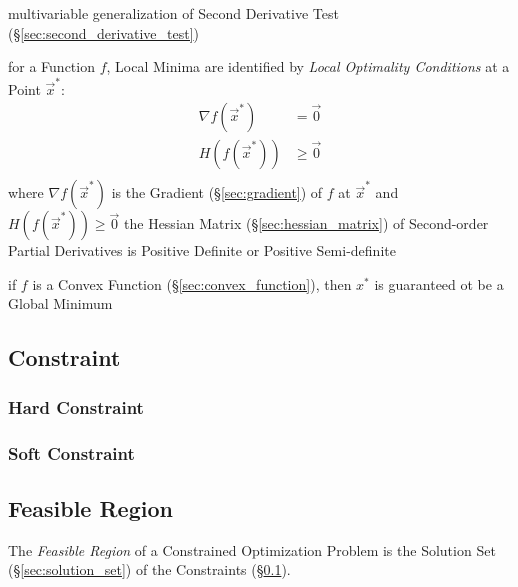 \fist multivariable generalization of Second Derivative Test
(\S\ref{sec:second_derivative_test})

for a Function $f$, Local Minima are identified by \emph{Local Optimality
  Conditions} at a Point $\vec{x}^*$:
\begin{align*}
  \nabla f(\vec{x}^*) & =    \vec{0} \\
  H(f(\vec{x}^*))     & \geq \vec{0} \\
\end{align*}
where $\nabla f(\vec{x}^*)$ is the Gradient (\S\ref{sec:gradient}) of $f$ at
$\vec{x}^*$ and $H(f(\vec{x}^*)) \geq \vec{0}$ the Hessian Matrix
(\S\ref{sec:hessian_matrix}) of Second-order Partial Derivatives is Positive
Definite or Positive Semi-definite

if $f$ is a Convex Function (\S\ref{sec:convex_function}), then $x^*$ is
guaranteed ot be a Global Minimum



\subsection{Constraint}\label{sec:constraint}

\subsubsection{Hard Constraint}\label{sec:hard_constraint}

\subsubsection{Soft Constraint}\label{sec:soft_constraint}



\subsection{Feasible Region}\label{sec:feasible_region}

The \emph{Feasible Region} of a Constrained Optimization Problem is the
Solution Set (\S\ref{sec:solution_set}) of the Constraints
(\S\ref{sec:constraint}).



